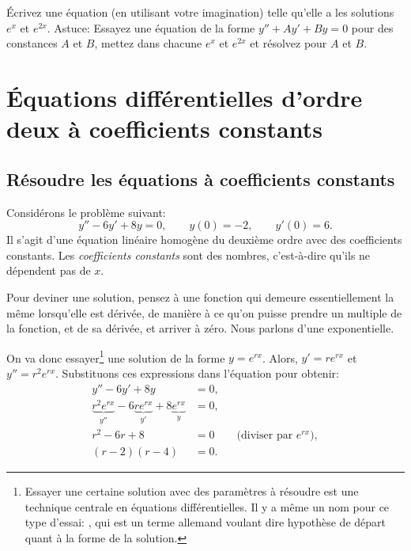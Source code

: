 \begin{exercise}
	Écrivez une équation (en utilisant votre imagination) telle qu'elle a les solutions 
	$e^x$ et $e^{2x}$.  Astuce: Essayez une équation de la forme 
	$y''+Ay'+By = 0$ pour des constances $A$ et $B$,
	mettez dans chacune $e^x$ et $e^{2x}$ et résolvez pour $A$ et $B$.
	\end{exercise}



\sectionnewpage
\section{Équations différentielles d'ordre deux à coefficients constants}
\label{sec:ccsol}





\subsection{Résoudre les équations à coefficients constants}

Considérons le problème suivant: 
\begin{equation*}
	y''-6y'+8y = 0, \qquad y(0) = - 2, \qquad y'(0) = 6 .
\end{equation*}
Il s'agit d'une équation linéaire homogène du deuxième ordre avec des coefficients constants. 
Les  \emph{coefficients constants}
sont des nombres, c'est-à-dire qu'ils ne dépendent pas de $x$.  

Pour deviner une solution, pensez à une fonction qui demeure essentiellement la même lorsqu'elle est dérivée, de manière à ce qu'on puisse prendre un multiple de la fonction, et de sa dérivée,  et arriver à zéro.  Nous parlons d'une exponentielle. 

On va donc essayer\footnote{%
Essayer une certaine solution avec des paramètres à résoudre est une technique centrale en équations différentielles.  Il y a même un nom pour ce type d'essai: \emph{}, qui est un terme allemand voulant dire \og{}hypothèse de départ\fg{} quant à la forme de la solution. %
} 
une solution de la forme $y = e^{rx}$.  
Alors, $y' = r e^{rx}$ et $y'' = r^2 e^{rx}$.  
Substituons ces expressions dans l'équation pour obtenir: 
\begin{align*}
	y''-6y'+8y & = 0 , \\
	\underbrace{r^2 e^{rx}}_{y''} -6 \underbrace{r e^{rx}}_{y'}+8 \underbrace{e^{rx}}_{y} & = 0 , \\
	r^2 -6 r +8 & = 0 \qquad \text{(diviser par } e^{rx} \text{)},\\
	(r-2)(r-4) & = 0 .
\end{align*}

